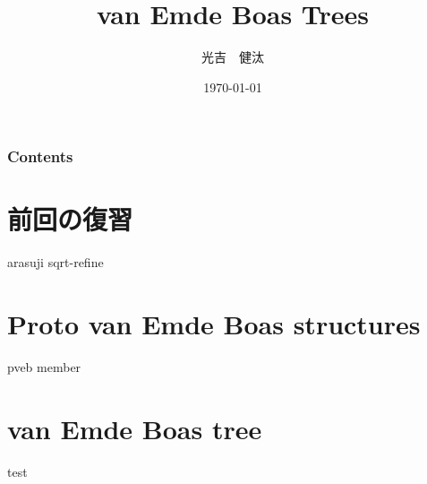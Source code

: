 \documentclass[dvipdfmx,12pt,notheorems]{beamer}
\title[略タイトル]{van Emde Boas Trees}
\author[Mitsuyoshi]{光吉　健汰}
\institute[IKN]{北海道大学工学部 情報エレクトロニクス学科 情報理工学コース 4年\\
情報知識ネットワーク研究室}
\date{\today}%
\theoremstyle{definition}
\begin{document}
\begin{frame}\frametitle{}
\titlepage
\end{frame}

\begin{frame}
	\frametitle{Contents}
	\tableofcontents[
	]
\end{frame}
\section{前回の復習}
{arasuji}
{sqrt-refine}
\section{Proto van Emde Boas structures}
{pveb}
{member}
\section{van Emde Boas tree}
\begin{frame}
	test
\end{frame}
\end{document}
